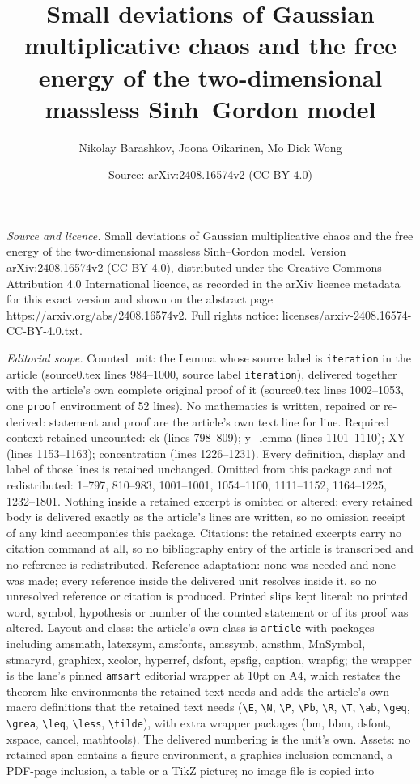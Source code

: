 \documentclass[10pt,a4paper]{amsart}
\title[Small deviations of Gaussian multiplicative chaos and the fr]{Small deviations of Gaussian multiplicative chaos and the free energy of the two-dimensional massless Sinh--Gordon model}
\author{Nikolay Barashkov, Joona Oikarinen, Mo Dick Wong}
\date{Source: arXiv:2408.16574v2 (CC BY 4.0)}
\begin{document}
\maketitle

\noindent\emph{Source and licence.} Small deviations of Gaussian multiplicative chaos and the free energy of the two-dimensional massless Sinh--Gordon model. Version arXiv:2408.16574v2 (CC BY 4.0), distributed under the Creative Commons Attribution 4.0 International licence, as recorded in the arXiv licence metadata for this exact version and shown on the abstract page https://arxiv.org/abs/2408.16574v2. Full rights notice: licenses/arxiv-2408.16574-CC-BY-4.0.txt.\par\smallskip

\noindent\textit{Editorial scope.} Counted unit: the Lemma whose source label is \texttt{iteration} in the article (source0.tex lines 984--1000, source label \texttt{iteration}), delivered together with the article's own complete original proof of it (source0.tex lines 1002--1053, one \texttt{proof} environment of 52 lines). No mathematics is written, repaired or re-derived: statement and proof are the article's own text line for line. Required context retained uncounted: ck (lines 798--809); y\_lemma (lines 1101--1110); XY (lines 1153--1163); concentration (lines 1226--1231). Every definition, display and label of those lines is retained unchanged. Omitted from this package and not redistributed: 1--797, 810--983, 1001--1001, 1054--1100, 1111--1152, 1164--1225, 1232--1801. Nothing inside a retained excerpt is omitted or altered: every retained body is delivered exactly as the article's lines are written, so no omission receipt of any kind accompanies this package. Citations: the retained excerpts carry no citation command at all, so no bibliography entry of the article is transcribed and no reference is redistributed. Reference adaptation: none was needed and none was made; every reference inside the delivered unit resolves inside it, so no unresolved reference or citation is produced. Printed slips kept literal: no printed word, symbol, hypothesis or number of the counted statement or of its proof was altered. Layout and class: the article's own class is \texttt{article} with packages including amsmath, latexsym, amsfonts, amssymb, amsthm, MnSymbol, stmaryrd, graphicx, xcolor, hyperref, dsfont, epsfig, caption, wrapfig; the wrapper is the lane's pinned \texttt{amsart} editorial wrapper at 10pt on A4, which restates the theorem-like environments the retained text needs and adds the article's own macro definitions that the retained text needs (\texttt{\textbackslash E}, \texttt{\textbackslash N}, \texttt{\textbackslash P}, \texttt{\textbackslash Pb}, \texttt{\textbackslash R}, \texttt{\textbackslash T}, \texttt{\textbackslash ab}, \texttt{\textbackslash geq}, \texttt{\textbackslash grea}, \texttt{\textbackslash leq}, \texttt{\textbackslash less}, \texttt{\textbackslash tilde}), with extra wrapper packages (bm, bbm, dsfont, xspace, cancel, mathtools). The delivered numbering is the unit's own. Assets: no retained span contains a figure environment, a graphics-inclusion command, a PDF-page inclusion, a table or a TikZ picture; no image file is copied into 
\end{document}
